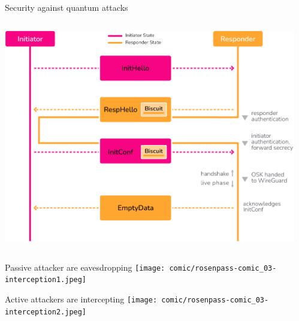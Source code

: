\begin{frame}{Security against quantum attacks}
  \begin{columns}[fullwidth,c]
    \begin{column}{.6\linewidth}
      \includegraphics[height=\defaultframetextheight]{graphics/rosenpass-wp-key-exchange-protocol-rgb.pdf}
    \end{column}

    \begin{column}{.4\linewidth}
    \end{column}
  \end{columns}
\end{frame}


\begin{frame}{Passive attacker are eavesdropping}
  \texttt{[image: comic/rosenpass-comic\_03-interception1.jpeg]}
\end{frame}

\begin{frame}{Active attackers are intercepting}
  \texttt{[image: comic/rosenpass-comic\_03-interception2.jpeg]}
\end{frame}

